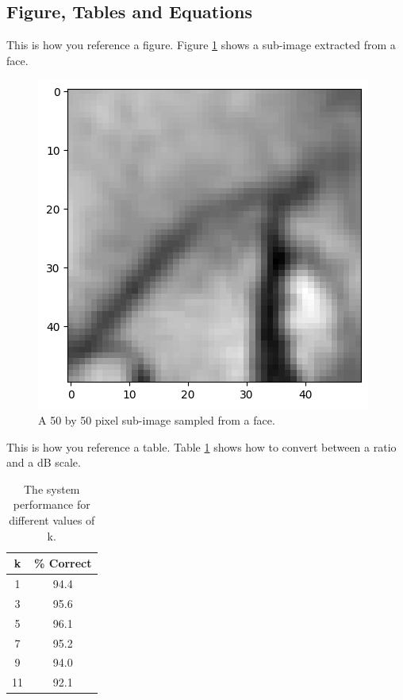 \documentclass[a4paper]{article}
\begin{document}
\subsection{Figure, Tables and Equations}

This is how you reference a figure. Figure \ref{fig:face} shows a sub-image extracted from a face.

\begin{figure}[t]
    \centering
    \includegraphics[width=\linewidth]{face50_1.png}
    \caption{A 50 by 50 pixel sub-image sampled from a face.}
    \label{fig:face}
  \end{figure}

This is how you reference a table. Table \ref{tab:example} shows how to convert between a ratio and a dB scale.
\begin{table}[th]
    \caption{The system performance for different values of k.}
    \label{tab:example}
    \centering
    \begin{tabular}{ c|c}
      \toprule
      k & \% Correct\\
      \midrule
       1 & 94.4 \\
       3 & 95.6 \\
       5 & 96.1 \\
       7 & 95.2 \\
       9 & 94.0 \\
       11 & 92.1 \\
      \bottomrule
    \end{tabular}

  \end{table}
\end{document}
